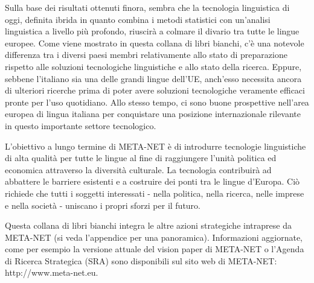 \documentclass[]{../../metanetpaper}
\begin{document}
\begin{multicols}{2}

Sulla base dei risultati ottenuti finora, sembra che la tecnologia linguistica
di oggi, definita ibrida in quanto combina i metodi statistici con un'analisi 
linguistica a livello pi\`{u} profondo, riuscir\`{a} a colmare il divario tra tutte le
lingue europee. Come viene mostrato in questa collana di libri bianchi,
c'\`{e} una notevole differenza tra i diversi paesi membri relativamente allo
stato di preparazione rispetto alle soluzioni tecnologiche linguistiche e allo
stato della ricerca. Eppure, sebbene l'italiano sia una delle grandi lingue
dell'UE, anch'esso necessita ancora di ulteriori ricerche prima di poter avere
soluzioni tecnologiche veramente efficaci pronte per l'uso quotidiano. Allo
stesso tempo, ci sono buone prospettive nell'area europea di lingua italiana
per conquistare una posizione internazionale rilevante in questo
importante settore tecnologico.

L'obiettivo a lungo termine di META-NET \`{e} di introdurre tecnologie
linguistiche di alta qualit\`{a} per tutte le lingue al fine di raggiungere
l'unit\`{a} politica ed economica attraverso la diversit\`{a} culturale. La
tecnologia contribuir\`{a} ad abbattere le barriere esistenti e a costruire
dei ponti tra le lingue d'Europa. Ci\`{o} richiede che tutti i soggetti
interessati - nella politica, nella ricerca, nelle imprese e nella societ\`{a}
- uniscano i propri sforzi per il futuro.

Questa collana di libri bianchi integra le altre azioni strategiche intraprese da 
META-NET (si veda l'appendice per una panoramica). Informazioni aggiornate,
come per esempio la versione attuale del vision paper di META-NET \cite{Meta1}
o l'Agenda di Ricerca Strategica (SRA) sono disponibili sul sito web di META-NET: 
http://www.meta-net.eu.

\end{multicols}

\clearpage


\end{document}
